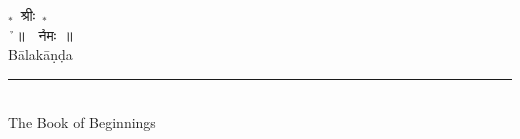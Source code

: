 %
%

\fancyhead[LE]{\thepage}
\setcounter{page}{1}
\renewcommand{\headrulewidth}{1pt}

\fancyhead[RO,LE]{\thepage}

%
%
%
%
%
%
%

\begin{center}
{\Huge $_{*}$}~{\la श्रीः}~{\Huge $_{*}$}\\
\h{~॥~}\om\ \h{नमः~॥}\\
\vspace{2mm}
{\en\LARGE Bālakāṇḍa}\\
\rule{.1\linewidth}{1pt}\\
\vspace{1mm}
{\en\large The Book of Beginnings}
\end{center}

